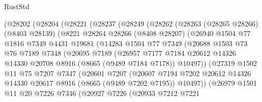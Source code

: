 \begin{lexlean}{RustStd}
\begin{coremodule}
        (@28202
          (@28204
            (@28221
              (@28237
                (@28249
                  (@28262
                    (@28263
                      (@28265 @28266)
                      (@8403 @28139)
                      (@8221
                        @28264
                        @28266
                        (@8408 @28207)
                        (@26940
                          @1504
                          @77
                          @1816
                          @7349
                          @4431
                          @19681
                          (@14283
                            @1504
                            @77
                            @7349
                            (@20688
                              @1503
                              @73
                              @76
                              @7189
                              @7348
                              (@20695
                                @7189
                                (@26957
                                  @7177
                                  @7184
                                  @20612
                                  @14326
                                  @14330
                                  @20708
                                  @8916
                                  (@8665 (@9489 @7184 @7178))
                                  @10497))
                              (@27319
                                @1502
                                @11
                                @75
                                @7207
                                @7347
                                (@20601
                                  @7207
                                  (@20607
                                    @7194
                                    @7202
                                    @20612
                                    @14326
                                    @14330
                                    @20617
                                    @8916
                                    (@8665 (@9489 @7202 @7195))
                                    @10497))
                                (@26979
                                  @1501
                                  @11
                                  @20
                                  @7226
                                  @7346
                                  (@20927
                                    @7226
                                    (@20933
                                      @7212
                                      @7221

\end{coremodule}
\end{lexlean}
